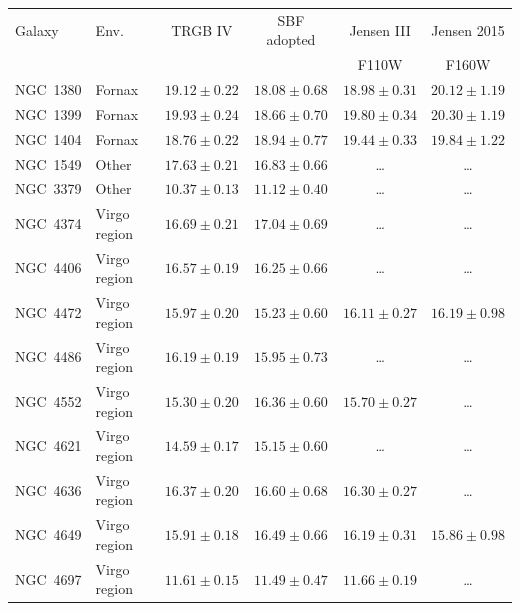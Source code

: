 \begin{tabular}{llcccc}
\toprule
Galaxy & Env. & TRGB IV & SBF adopted & Jensen III & Jensen 2015 \\
 & & & & F110W & F160W \\
\midrule
NGC~1380 & Fornax & $19.12\pm0.22$ & $18.08\pm0.68$ & $18.98\pm0.31$ & $20.12\pm1.19$ \\
NGC~1399 & Fornax & $19.93\pm0.24$ & $18.66\pm0.70$ & $19.80\pm0.34$ & $20.30\pm1.19$ \\
NGC~1404 & Fornax & $18.76\pm0.22$ & $18.94\pm0.77$ & $19.44\pm0.33$ & $19.84\pm1.22$ \\
NGC~1549 & Other & $17.63\pm0.21$ & $16.83\pm0.66$ & \ldots & \ldots \\
NGC~3379 & Other & $10.37\pm0.13$ & $11.12\pm0.40$ & \ldots & \ldots \\
NGC~4374 & Virgo region & $16.69\pm0.21$ & $17.04\pm0.69$ & \ldots & \ldots \\
NGC~4406 & Virgo region & $16.57\pm0.19$ & $16.25\pm0.66$ & \ldots & \ldots \\
NGC~4472 & Virgo region & $15.97\pm0.20$ & $15.23\pm0.60$ & $16.11\pm0.27$ & $16.19\pm0.98$ \\
NGC~4486 & Virgo region & $16.19\pm0.19$ & $15.95\pm0.73$ & \ldots & \ldots \\
NGC~4552 & Virgo region & $15.30\pm0.20$ & $16.36\pm0.60$ & $15.70\pm0.27$ & \ldots \\
NGC~4621 & Virgo region & $14.59\pm0.17$ & $15.15\pm0.60$ & \ldots & \ldots \\
NGC~4636 & Virgo region & $16.37\pm0.20$ & $16.60\pm0.68$ & $16.30\pm0.27$ & \ldots \\
NGC~4649 & Virgo region & $15.91\pm0.18$ & $16.49\pm0.66$ & $16.19\pm0.31$ & $15.86\pm0.98$ \\
NGC~4697 & Virgo region & $11.61\pm0.15$ & $11.49\pm0.47$ & $11.66\pm0.19$ & \ldots \\
\bottomrule
\end{tabular}
